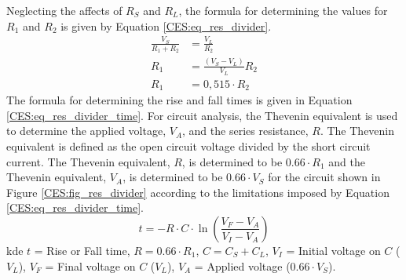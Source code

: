         Neglecting the affects of $R_S$ and $R_L$, the formula for determining the values for $R_1$
        and $R_2$ is given by Equation \ref{CES:eq_res_divider}.
        \begin{align}\label{CES:eq_res_divider}
          \frac{V_S}{R_1+R_2} &= \frac{V_L}{R_2}           \nonumber \\
                          R_1 &= \frac{(V_S-V_L)}{V_L}R_2  \nonumber \\
                          R_1 &= 0,515\cdot R_2
        \end{align}      
        The formula for determining the rise and fall times is given in Equation
        \ref{CES:eq_res_divider_time}. For circuit analysis, the Thevenin equivalent is used to
        determine the applied voltage, $V_A$, and the series resistance, $R$.
        The Thevenin equivalent is defined as the open circuit voltage divided by the short circuit
        current. The Thevenin equivalent, $R$, is determined to be $0.66\cdot R_1$ and the Thevenin
        equivalent, $V_A$, is determined to be $0.66\cdot V_S$ for the circuit shown in  Figure
        \ref{CES:fig_res_divider} according to the limitations imposed by Equation
        \ref{CES:eq_res_divider_time}.
        \begin{equation}\label{CES:eq_res_divider_time}
          t = - R\cdot C \cdot \ln\left(\frac{V_F-V_A}{V_I-V_A}\right)
        \end{equation}  
        kde $t$ = Rise or Fall time, $R = 0.66\cdot R_1$, $C = C_S+C_L$, $V_I$ = Initial voltage on
        $C$ ($V_L$), $V_F$ = Final voltage on $C$ ($V_L$), $V_A$ = Applied voltage ($0.66\cdot V_S$). 
